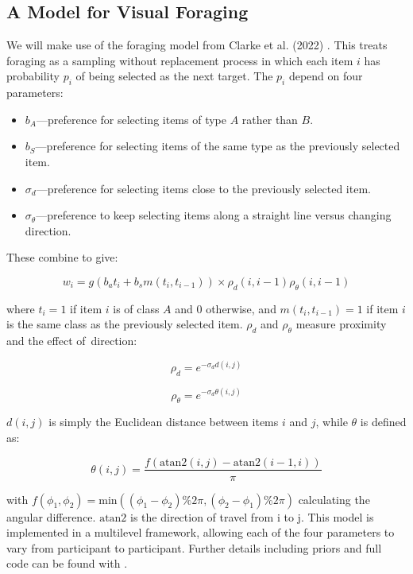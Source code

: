 \documentclass[vision,article,accept,pdftex,moreauthors]{Definitions/mdpi}
\begin{document}
\subsection{A Model for Visual Foraging}

We will make use of the foraging model from Clarke et al. (2022) \cite{clarke2022foraging}. This treats foraging as a sampling without replacement process in which each item $i$ has probability $p_i$ of being selected as the next target. The $p_i$ depend on four parameters:

\begin{itemize}
    \item $b_A$---preference for selecting items of type $A$ rather than $B$.
    \item $b_S$---preference for selecting items of the same type as the previously selected item.
    \item $\sigma_d$---preference for selecting items close to the previously selected item.
    \item $\sigma_{\theta}$---preference to keep selecting items along a straight line versus changing direction.
\end{itemize}

These combine to give:
\begin{linenomath}
\begin{equation}
    w_i = g\left(b_at_i + b_sm(t_i, t_{i-1})\right) \times \rho_d(i, i-1) \rho_{\theta}(i, i-1)
\end{equation}
\end{linenomath}
where $t_i = 1$ if item $i$ is of class $A$ and 0 otherwise, and  $m(t_i, t_{i-1}) =1$ if item $i$ is the same class as the previously selected item. $\rho_d$ and $\rho_{\theta}$ measure proximity and the effect of~direction:
\begin{linenomath}
\begin{equation}
    \rho_d = e^{-\sigma_dd(i,j)}
\end{equation}
\end{linenomath}
\begin{linenomath}
\begin{equation}
    \rho_{\theta} = e^{-\sigma_d\theta(i,j)}
\end{equation}
\end{linenomath}
$d(i,j)$ is simply the Euclidean distance between items $i$ and $j$, while $\theta$ is defined as:
\begin{linenomath}
\begin{equation}
    \theta(i,j) = \frac{f(\text{atan2}(i, j) - \text{atan2}(i-1, i))}{\pi}
\end{equation}
\end{linenomath}
with $f(\phi_1, \phi_2) = \text{min}((\phi_1 - \phi_2) \% 2\pi, (\phi_2 - \phi_1) \% 2\pi)$ calculating the angular difference. $\text{atan2}$ is the direction of travel from i to j.  This model is implemented in a multilevel framework, allowing each of the four parameters to vary from participant to participant. Further details including priors and full code can be found with \cite{clarke2022foraging}.
\end{document}
